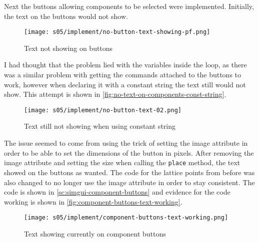 
    Next the buttons allowing components to be selected were implemented.
    Initially, the text on the buttons would not show.

    \begin{figure}[!ht]
        \centering
        \texttt{[image: s05/implement/no-button-text-showing-pf.png]}
        \caption{Text not showing on buttons}
        \label{fig:no-text-on-components}
    \end{figure}

    I had thought that the problem lied with the variables inside the loop, as there was a similar problem with getting the commands attached to the buttons to work, however when declaring it with a constant string the text still would not show.
    This attempt is shown in \autoref{fig:no-text-on-components-const-string}.

    \begin{figure}[!ht]
        \centering
        \texttt{[image: s05/implement/no-button-text-02.png]}
        \caption{Text still not showing when using constant string}
        \label{fig:no-text-on-components-const-string}
    \end{figure}

    The issue seemed to come from using the trick of setting the image attribute in order to be able to set the dimensions of the button in pixels.
    After removing the image attribute and setting the size when calling the \verb|place| method, the text showed on the buttons as wanted. 
    The code for the lattice points from before was also changed to no longer use the image attribute in order to stay consistent. 
    The code is shown in \autoref{sc:simgui-component-buttons} and evidence for the code working is shown in \autoref{fig:component-buttons-text-working}. 

    \begin{figure}[!ht]
        \centering
        \texttt{[image: s05/implement/component-buttons-text-working.png]}
        \caption{Text showing currently on component buttons}
        \label{fig:component-buttons-text-working}
    \end{figure}


